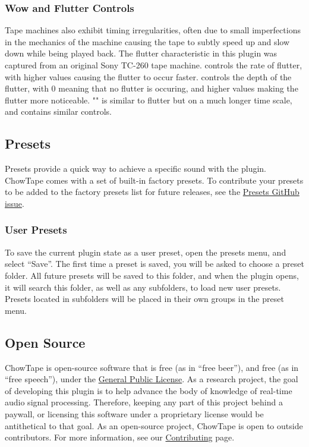 \documentclass[landscape,twocolumn,a5paper]{manual}
\begin{document}
\subsubsection{Wow and Flutter Controls}
Tape machines also exhibit timing irregularities, often due
to small imperfections in the mechanics of the machine causing
the tape to subtly speed up and slow down while being
played back. The flutter characteristic in this plugin was
captured from an original Sony TC-260 tape machine.
\newpar
{} controls the rate of flutter, with higher values
causing the flutter to occur faster.  controls the
depth of the flutter, with 0 meaning that no flutter is occuring, and
higher values making the flutter more noticeable.
\newpar
"" is similar to flutter but on a much longer time scale,
and contains similar controls.

\subsection{Presets}
Presets provide a quick way to achieve a specific sound
with the plugin. ChowTape comes with a set of built-in
factory presets. To contribute your presets to be added
to the factory presets list for future releases, see the
\href{https://github.com/jatinchowdhury18/AnalogTapeModel/issues/30}{Presets GitHub issue}.

\subsubsection{User Presets}
To save the current plugin state as a user preset, open
the presets menu, and select ``Save''. The first time a
preset is saved, you will be asked to choose a preset
folder. All future presets will be saved to this folder,
and when the plugin opens, it will search this folder, as
well as any subfolders, to load new user presets.
Presets located in subfolders will be placed in their
own groups in the preset menu.

\subsection{Open Source}
ChowTape is open-source software that is free (as in ``free
beer''), and free (as in ``free speech''), under the
\href{https://www.gnu.org/licenses/gpl-3.0}{General Public License}.
As a research project, the goal of developing this plugin is
to help advance the body of knowledge of real-time audio
signal processing. Therefore, keeping any part of this project
behind a paywall, or licensing this software under a proprietary
license would be antithetical to that goal. As an open-source
project, ChowTape is open to outside contributors. For more
information, see our
\href{https://github.com/jatinchowdhury18/AnalogTapeModel/blob/master/CONTRIBUTING.md}{Contributing}
page.
\newpar
\end{document}

